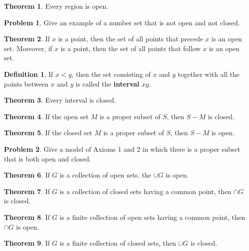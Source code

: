 \documentclass{article}
\theoremstyle{definition}
\newtheorem{definition}{Definition}
\newtheorem{theorem}{Theorem}
\theoremstyle{definition}
\newtheorem{problem}{Problem}
\theoremstyle{plain}
\begin{document}
\begin{theorem}
  Every region is open.
\end{theorem}

\begin{problem}
  Give an example of a number set that is not open and not closed.
\end{problem}

\begin{theorem}
  If $x$ is a point, then the set of all points that precede $x$ is an open
  set.  Moreover, if $x$ is a point, then the set of all points that follow $x$
  is an open set.
\end{theorem}

\begin{definition}
  If $x < y$, then the set consisting of $x$ and $y$ together with all the
  points between $x$ and $y$ is called the \textbf{interval} $xy$.
\end{definition}

\begin{theorem}
  Every interval is closed.
\end{theorem}

\begin{theorem}
  If the open set $M$ is a proper subset of $S$, then $S -
  M$ is closed.
\end{theorem}

\begin{theorem}
   If the closed set $M$ is a proper subset of $S$, then $S
  - M$ is open.
\end{theorem}

\begin{problem}
  Give a model of Axioms 1 and 2 in which there is a proper subset that is both
  open and closed.
\end{problem}

\begin{theorem}
  If $G$ is a collection of open sets, the $\cup G$ is open.
\end{theorem}

\begin{theorem}
  If $G$ is a collection of closed sets having a common point, then $\cap G$ is
  closed.
\end{theorem}

\begin{theorem}
  If $G$ is a finite collection of open sets having a common point, then $\cap
  G$ is open.
\end{theorem}

\begin{theorem}
  If $G$ is a finite collection of closed sets, then $\cup G$ is closed.
\end{theorem}
\end{document}
